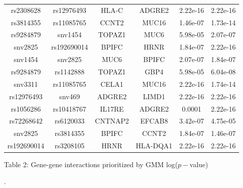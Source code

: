 \documentclass[final]{beamer}
\newlength{\onecolwid}
\begin{document}
\begin{frame}[t]
\begin{columns}[t]
\begin{column}{\onecolwid}
{\begin{table}
\begin{center}
\begin{tabular}{|cc|cc|cc|}
       rs2308628   & rs12976493  & HLA-C     & ADGRE2   & 2.22e-16  & 2.22e-16 \\
       rs3814355   & rs11085765  & CCNT2     & MUC16    & 1.46e-07  & 1.73e-14 \\
       rs9284879   & snv1454     & TOPAZ1    & MUC6     & 5.98e-05  & 2.07e-07 \\
       snv2825     & rs192690014 & BPIFC     & HRNR     & 1.84e-07  & 2.22e-16 \\
       snv1454     & snv2825     & MUC6      & BPIFC    & 2.07e-07  & 1.84e-07 \\
       rs9284879   & rs1142888   & TOPAZ1    & GBP4     & 5.98e-05  & 6.04e-08 \\
       snv3311     & rs11085765  & CELA1     & MUC16    & 2.22e-16  & 1.74e-14 \\
       rs12976493  & snv469      & ADGRE2    & LIMD1    & 2.22e-16  & 2.22e-16 \\
       rs1056286   & rs10418767  & IL17RE    & ADGRE2   & 0.0001    & 2.22e-16 \\
       rs72268642  & rs6120033   & CNTNAP2 & EFCAB8    & 3.42e-07 & 4.75e-05 \\
       snv2825     & rs3814355   & BPIFC     & CCNT2    & 1.84e-07  & 1.46e-07 \\
       rs192690014 & rs3208105   & HRNR      & HLA-DQA1 &2.22e-16   & 2.22e-16 \\
       \hline
       \end{tabular}
       \end{center} 
       \begin{flushleft}\small{\color{darkblue}Table 2: \color{black} Gene-gene interactions prioritized by GMM log($p-$value)}\end{flushleft}.
           \label{fig:manhattan}
       \end{table}
       }  
     

\end{column}
\end{columns}
\end{frame}
\end{document}
